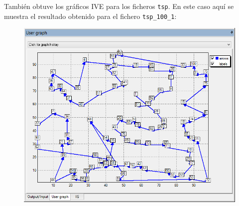 \documentclass[a4paper,11pt]{article}
\begin{document}
También obtuve los gráficos IVE para los ficheros \texttt{tsp}. En este caso aquí se muestra el resultado obtenido para el fichero \texttt{tsp\_100\_1}:

\begin{figure}[!htbp]
	\centering
	\includegraphics[width=1.0\textwidth]{sa_tsp_100_1.png}
\end{figure}
\end{document}
